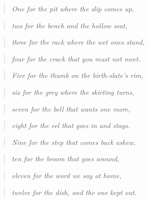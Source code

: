 \documentclass{design/chronicle}
\begin{document}
\begin{quote}\itshape One for the pit where the slip comes up,\end{quote}

\begin{quote}\itshape two for the bench and the hollow seat,\end{quote}

\begin{quote}\itshape three for the rack where the wet ones stand,\end{quote}

\begin{quote}\itshape four for the crack that you must not meet.\end{quote}

\begin{quote}\itshape \end{quote}

\begin{quote}\itshape Five for the thumb on the birth-slate’s rim,\end{quote}

\begin{quote}\itshape six for the grey where the skirting turns,\end{quote}

\begin{quote}\itshape seven for the bell that wants one more,\end{quote}

\begin{quote}\itshape eight for the eel that goes in and stays.\end{quote}

\begin{quote}\itshape \end{quote}

\begin{quote}\itshape Nine for the step that comes back askew,\end{quote}

\begin{quote}\itshape ten for the broom that goes around,\end{quote}

\begin{quote}\itshape eleven for the word we say at home,\end{quote}

\begin{quote}\itshape twelve for the dish, and the one kept out.\end{quote}
\end{document}
